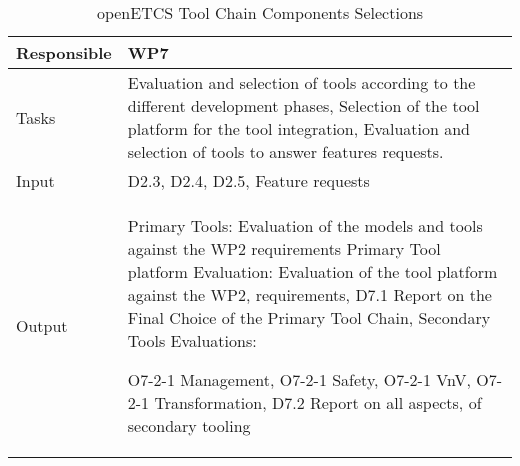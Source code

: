 \documentclass{template/openetcs_article}
\begin{document}
\begin{table}[H]
	\begin{center}
		\tablehead{\hline
			}
		\begin{supertabular}[H]{|p{6cm}|p{8cm}|}
			\hline
			
			Responsible &
			WP7 \\
			\hline

			Tasks &
			
				 Evaluation and selection of tools according to the different development phases, Selection of the tool platform for the tool integration, Evaluation and selection of tools to answer features requests.\\
			 \hline
			
			Input &
			D2.3,
			D2.4,
			D2.5,
			Feature requests\\
			\hline
			
			Output &
			 Primary Tools: 
			 Evaluation of the models and tools against the WP2 requirements
				Primary Tool platform  Evaluation: Evaluation of the tool platform against the WP2, requirements, D7.1 Report on the Final Choice of the Primary Tool Chain, Secondary Tools Evaluations:
					
				 O7-2-1 Management,
				 O7-2-1 Safety,
				 O7-2-1 VnV,
				 O7-2-1 Transformation,
				 D7.2 Report on all aspects, of secondary tooling\\
				 \hline
		\end{supertabular}
\end{center}
\caption{openETCS Tool Chain Components Selections}
\end{table}
\end{document}
